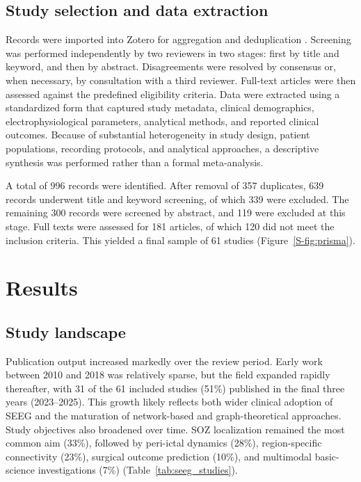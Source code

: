 \documentclass[12pt]{article}
\begin{document}
\subsection{Study selection and data extraction}
Records were imported into Zotero for aggregation and deduplication \cite{behera2022zotero}. Screening was performed independently by two reviewers in two stages: first by title and keyword, and then by abstract. Disagreements were resolved by consensus or, when necessary, by consultation with a third reviewer. Full-text articles were then assessed against the predefined eligibility criteria. Data were extracted using a standardized form that captured study metadata, clinical demographics, electrophysiological parameters, analytical methods, and reported clinical outcomes. Because of substantial heterogeneity in study design, patient populations, recording protocols, and analytical approaches, a descriptive synthesis was performed rather than a formal meta-analysis.

A total of 996 records were identified. After removal of 357 duplicates, 639 records underwent title and keyword screening, of which 339 were excluded. The remaining 300 records were screened by abstract, and 119 were excluded at this stage. Full texts were assessed for 181 articles, of which 120 did not meet the inclusion criteria. This yielded a final sample of 61 studies (Figure~\ref{S-fig:prisma}).


\section{Results}

\subsection{Study landscape}
Publication output increased markedly over the review period. Early work between 2010 and 2018 was relatively sparse, but the field expanded rapidly thereafter, with 31 of the 61 included studies (51\%) published in the final three years (2023--2025). This growth likely reflects both wider clinical adoption of SEEG and the maturation of network-based and graph-theoretical approaches. Study objectives also broadened over time. SOZ localization remained the most common aim (33\%), followed by peri-ictal dynamics (28\%), region-specific connectivity (23\%), surgical outcome prediction (10\%), and multimodal basic-science investigations (7\%) (Table~\ref{tab:seeg_studies}).
\end{document}
